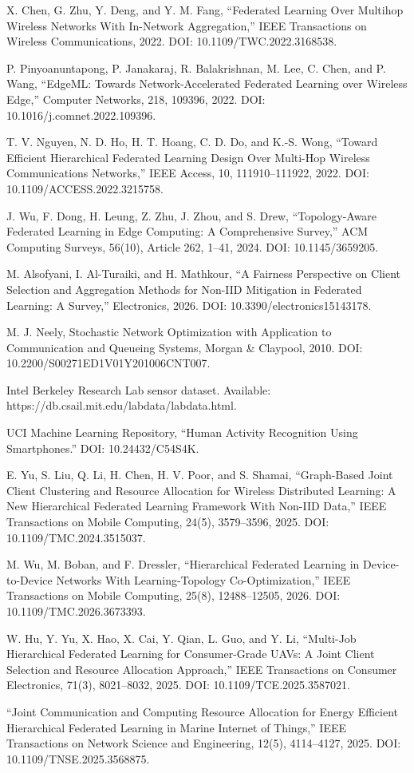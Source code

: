 \documentclass[11pt]{article}
\begin{document}
\noindent [9] X. Chen, G. Zhu, Y. Deng, and Y. M. Fang, “Federated Learning Over Multihop Wireless Networks With In-Network Aggregation,” IEEE Transactions on Wireless Communications, 2022. DOI: 10.1109/TWC.2022.3168538.\par
\noindent [10] P. Pinyoanuntapong, P. Janakaraj, R. Balakrishnan, M. Lee, C. Chen, and P. Wang, “EdgeML: Towards Network-Accelerated Federated Learning over Wireless Edge,” Computer Networks, 218, 109396, 2022. DOI: 10.1016/j.comnet.2022.109396.\par
\noindent [11] T. V. Nguyen, N. D. Ho, H. T. Hoang, C. D. Do, and K.-S. Wong, “Toward Efficient Hierarchical Federated Learning Design Over Multi-Hop Wireless Communications Networks,” IEEE Access, 10, 111910–111922, 2022. DOI: 10.1109/ACCESS.2022.3215758.\par
\noindent [12] J. Wu, F. Dong, H. Leung, Z. Zhu, J. Zhou, and S. Drew, “Topology-Aware Federated Learning in Edge Computing: A Comprehensive Survey,” ACM Computing Surveys, 56(10), Article 262, 1–41, 2024. DOI: 10.1145/3659205.\par
\noindent [13] M. Alsofyani, I. Al-Turaiki, and H. Mathkour, “A Fairness Perspective on Client Selection and Aggregation Methods for Non-IID Mitigation in Federated Learning: A Survey,” Electronics, 2026. DOI: 10.3390/electronics15143178.\par
\noindent [14] M. J. Neely, Stochastic Network Optimization with Application to Communication and Queueing Systems, Morgan \& Claypool, 2010. DOI: 10.2200/S00271ED1V01Y201006CNT007.\par
\noindent [15] Intel Berkeley Research Lab sensor dataset. Available: https://db.csail.mit.edu/labdata/labdata.html.\par
\noindent [16] UCI Machine Learning Repository, “Human Activity Recognition Using Smartphones.” DOI: 10.24432/C54S4K.\par
\noindent [17] E. Yu, S. Liu, Q. Li, H. Chen, H. V. Poor, and S. Shamai, “Graph-Based Joint Client Clustering and Resource Allocation for Wireless Distributed Learning: A New Hierarchical Federated Learning Framework With Non-IID Data,” IEEE Transactions on Mobile Computing, 24(5), 3579–3596, 2025. DOI: 10.1109/TMC.2024.3515037.\par
\noindent [18] M. Wu, M. Boban, and F. Dressler, “Hierarchical Federated Learning in Device-to-Device Networks With Learning-Topology Co-Optimization,” IEEE Transactions on Mobile Computing, 25(8), 12488–12505, 2026. DOI: 10.1109/TMC.2026.3673393.\par
\noindent [19] W. Hu, Y. Yu, X. Hao, X. Cai, Y. Qian, L. Guo, and Y. Li, “Multi-Job Hierarchical Federated Learning for Consumer-Grade UAVs: A Joint Client Selection and Resource Allocation Approach,” IEEE Transactions on Consumer Electronics, 71(3), 8021–8032, 2025. DOI: 10.1109/TCE.2025.3587021.\par
\noindent [20] “Joint Communication and Computing Resource Allocation for Energy Efficient Hierarchical Federated Learning in Marine Internet of Things,” IEEE Transactions on Network Science and Engineering, 12(5), 4114–4127, 2025. DOI: 10.1109/TNSE.2025.3568875.\par
\end{document}
